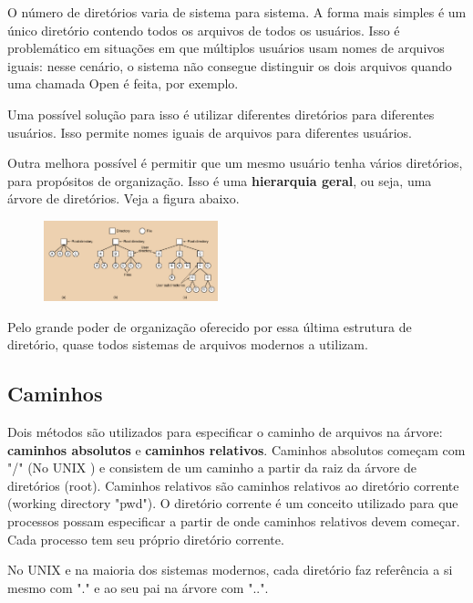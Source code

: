 \documentclass{article}
\newcommand\unix{{\color{red}UNIX} }
\begin{document}
O número de diretórios varia de sistema para sistema. A forma mais simples é um único diretório contendo todos os arquivos de todos os usuários. Isso é problemático em situações em que múltiplos usuários usam nomes de arquivos iguais: nesse cenário, o sistema não consegue distinguir os dois arquivos quando uma chamada Open é feita, por exemplo. 

Uma possível solução para isso é utilizar diferentes diretórios para diferentes usuários. Isso permite nomes iguais de arquivos para diferentes usuários.

Outra melhora possível é permitir que um mesmo usuário tenha vários diretórios, para propósitos de organização. Isso é uma \textbf{hierarquia geral}, ou seja, uma árvore de diretórios. Veja a figura abaixo.

\begin{figure}[h]
  \begin{center}
    \includegraphics[width=0.45\textwidth]{img/5-6.png}
  \end{center}
  \caption{}
  \label{fig:}
\end{figure}

Pelo grande poder de organização oferecido por essa última estrutura de diretório, quase todos sistemas de arquivos modernos a utilizam.

\subsection{Caminhos}

Dois métodos são utilizados para especificar o caminho de arquivos na árvore: \textbf{caminhos absolutos} e \textbf{caminhos relativos}. Caminhos absolutos começam com "/" (No \unix) e consistem de um caminho a partir da raiz da árvore de diretórios (root). Caminhos relativos são caminhos relativos ao diretório corrente (working directory "pwd"). O diretório corrente é um conceito utilizado para que processos possam especificar a partir de onde caminhos relativos devem começar. Cada processo tem seu próprio diretório corrente.

No \unix e na maioria dos sistemas modernos, cada diretório faz referência a si mesmo com "." e ao seu pai na árvore com "..".
\end{document}
